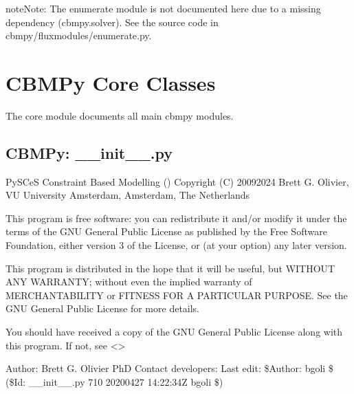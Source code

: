 \documentclass[letterpaper,12pt,english]{sphinxmanual}
\begin{document}
\begin{sphinxadmonition}{note}{Note:}
\sphinxAtStartPar
The enumerate module is not documented here due to a missing dependency
(cbmpy.solver). See the source code in cbmpy/fluxmodules/enumerate.py.
\end{sphinxadmonition}

\sphinxstepscope


\section{CBMPy Core Classes}
\label{\detokenize{api/core:cbmpy-core-classes}}\label{\detokenize{api/core::doc}}
\sphinxAtStartPar
The core module documents all main cbmpy modules.

\subsection{CBMPy: \_\_init\_\_.py}
\label{\detokenize{api/core:cbmpy-init-py}}\label{\detokenize{api/core:module-cbmpy}}
\sphinxAtStartPar
PySCeS Constraint Based Modelling ()
Copyright (C) 2009\sphinxhyphen{}2024 Brett G. Olivier, VU University Amsterdam, Amsterdam, The Netherlands

\sphinxAtStartPar
This program is free software: you can redistribute it and/or modify
it under the terms of the GNU General Public License as published by
the Free Software Foundation, either version 3 of the License, or
(at your option) any later version.

\sphinxAtStartPar
This program is distributed in the hope that it will be useful,
but WITHOUT ANY WARRANTY; without even the implied warranty of
MERCHANTABILITY or FITNESS FOR A PARTICULAR PURPOSE.  See the
GNU General Public License for more details.

\sphinxAtStartPar
You should have received a copy of the GNU General Public License
along with this program.  If not, see \textless{}\textgreater{}

\sphinxAtStartPar
Author: Brett G. Olivier PhD
Contact developers: 
Last edit: \$Author: bgoli \$ (\$Id: \_\_init\_\_.py 710 2020\sphinxhyphen{}04\sphinxhyphen{}27 14:22:34Z bgoli \$)
\end{document}
